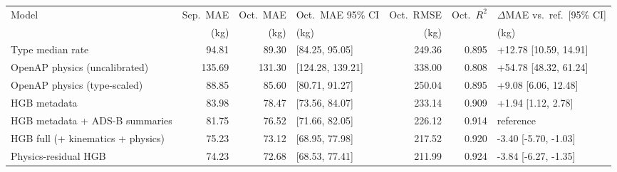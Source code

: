 \begin{tabular}{lrrlrrl}
\toprule
Model & Sep.\ MAE & Oct.\ MAE & Oct.\ MAE 95\% CI & Oct.\ RMSE & Oct.\ $R^2$ & $\Delta$MAE vs.\ ref.\ [95\% CI] \\
 & (kg) & (kg) & (kg) & (kg) & & (kg) \\
\midrule
Type median rate & 94.81 & 89.30 & [84.25, 95.05] & 249.36 & 0.895 & +12.78 [10.59, 14.91] \\
OpenAP physics (uncalibrated) & 135.69 & 131.30 & [124.28, 139.21] & 338.00 & 0.808 & +54.78 [48.32, 61.24] \\
OpenAP physics (type-scaled) & 88.85 & 85.60 & [80.71, 91.27] & 250.04 & 0.895 & +9.08 [6.06, 12.48] \\
HGB metadata & 83.98 & 78.47 & [73.56, 84.07] & 233.14 & 0.909 & +1.94 [1.12, 2.78] \\
HGB metadata + ADS-B summaries & 81.75 & 76.52 & [71.66, 82.05] & 226.12 & 0.914 & reference \\
HGB full (+ kinematics + physics) & 75.23 & 73.12 & [68.95, 77.98] & 217.52 & 0.920 & -3.40 [-5.70, -1.03] \\
Physics-residual HGB & 74.23 & 72.68 & [68.53, 77.41] & 211.99 & 0.924 & -3.84 [-6.27, -1.35] \\
\bottomrule
\end{tabular}
